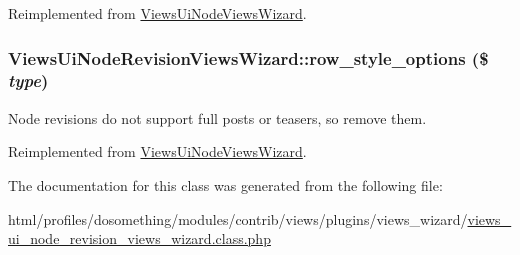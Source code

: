 Reimplemented from \hyperlink{classViewsUiNodeViewsWizard_a9272513dd5d6fc4bebfb85859cda7188}{ViewsUiNodeViewsWizard}.\hypertarget{classViewsUiNodeRevisionViewsWizard_a920d30184506f8f5a9c8db643742b329}{
\subsubsection[{row\_\-style\_\-options}]{\setlength{\rightskip}{0pt plus 5cm}ViewsUiNodeRevisionViewsWizard::row\_\-style\_\-options (\$ {\em type})}}
\label{classViewsUiNodeRevisionViewsWizard_a920d30184506f8f5a9c8db643742b329}
Node revisions do not support full posts or teasers, so remove them. 

Reimplemented from \hyperlink{classViewsUiNodeViewsWizard_acc49f93c07b0fdcacccc4c7d6d62d9ed}{ViewsUiNodeViewsWizard}.

The documentation for this class was generated from the following file:\begin{DoxyCompactItemize}
\item 
html/profiles/dosomething/modules/contrib/views/plugins/views\_\-wizard/\hyperlink{views__ui__node__revision__views__wizard_8class_8php}{views\_\-ui\_\-node\_\-revision\_\-views\_\-wizard.class.php}\end{DoxyCompactItemize}
